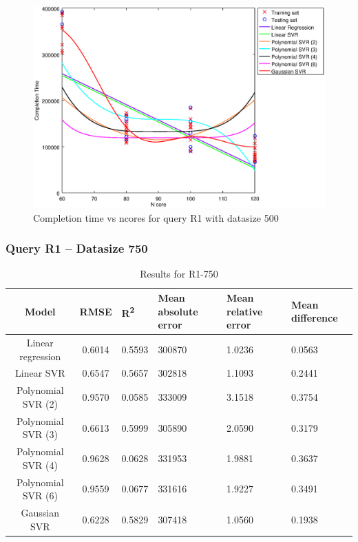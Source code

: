 \documentclass[a4paper,11pt]{article}
\begin{document}
\begin {figure}[hbtp]
\centering
\includegraphics[width=\textwidth]{output/R1_500_ONLY_1_LINEAR_NCORE/plot_R1_500.eps}
\caption{Completion time vs ncores for query R1 with datasize 500}
\label{fig:coreonly_linear_R1_500}
\end {figure}

\newpage
\subsubsection{Query R1 -- Datasize 750}
\begin{table}[H]
	\centering
	\begin{adjustbox}{center}
		\begin{tabular}{c | c M{1.2cm} M{2.5cm} M{2.5cm} M{1.8cm}}
			Model & RMSE & R\textsuperscript{2} & Mean absolute error & Mean relative error & Mean difference \tabularnewline
			\hline
			Linear regression & 0.6014 & 0.5593 & 300870 & 1.0236 & 0.0563 \\
			Linear SVR & 0.6547 & 0.5657 & 302818 & 1.1093 & 0.2441 \\
			Polynomial SVR (2) & 0.9570 & 0.0585 & 333009 & 3.1518 & 0.3754 \\
			Polynomial SVR (3) & 0.6613 & 0.5999 & 305890 & 2.0590 & 0.3179 \\
			Polynomial SVR (4) & 0.9628 & 0.0628 & 331953 & 1.9881 & 0.3637 \\
			Polynomial SVR (6) & 0.9559 & 0.0677 & 331616 & 1.9227 & 0.3491 \\
			Gaussian SVR & 0.6228 & 0.5829 & 307418 & 1.0560 & 0.1938 \\
		\end{tabular}
	\end{adjustbox}
	\\
	\caption{Results for R1-750}
	\label{fig:coreonly_linear_R1_750}
\end{table}
\end{document}
